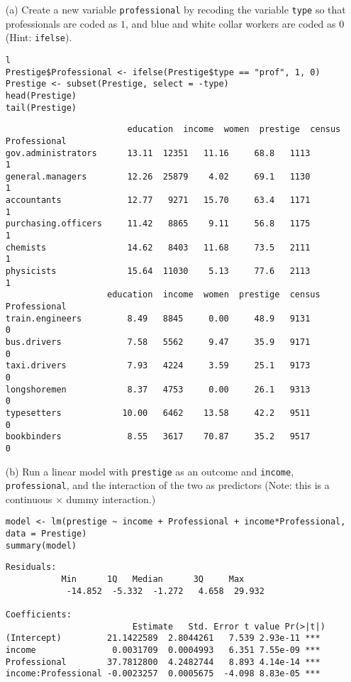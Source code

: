 \documentclass[12pt,letterpaper]{article}
\begin{document}
\newpage
\begin{enumerate}
	
	\item [(a)]
	Create a new variable \texttt{professional} by recoding the variable \texttt{type} so that professionals are coded as $1$, and blue and white collar workers are coded as $0$ (Hint: \texttt{ifelse}).
\begin{lstlisting}l
Prestige$Professional <- ifelse(Prestige$type == "prof", 1, 0)
Prestige <- subset(Prestige, select = -type)
head(Prestige)
tail(Prestige)	                                
\end{lstlisting}	                   
\begin{verbatim}
	                    education  income  women  prestige  census  Professional
gov.administrators      13.11  12351   11.16     68.8   1113            1
general.managers        12.26  25879    4.02     69.1   1130            1
accountants             12.77   9271   15.70     63.4   1171            1
purchasing.officers     11.42   8865    9.11     56.8   1175            1
chemists                14.62   8403   11.68     73.5   2111            1
physicists              15.64  11030    5.13     77.6   2113            1
                    education  income  women  prestige  census  Professional
train.engineers         8.49   8845     0.00     48.9   9131            0
bus.drivers             7.58   5562     9.47     35.9   9171            0
taxi.drivers            7.93   4224     3.59     25.1   9173            0
longshoremen            8.37   4753     0.00     26.1   9313            0
typesetters            10.00   6462    13.58     42.2   9511            0
bookbinders             8.55   3617    70.87     35.2   9517            0
\end{verbatim}
	
	
	\item [(b)]
	Run a linear model with \texttt{prestige} as an outcome and \texttt{income}, \texttt{professional}, and the interaction of the two as predictors (Note: this is a continuous $\times$ dummy interaction.)
\begin{lstlisting}
model <- lm(prestige ~ income + Professional + income*Professional, data = Prestige)
summary(model)
\end{lstlisting}
\begin{verbatim}
Residuals:   
           Min      1Q   Median      3Q     Max
	        -14.852  -5.332  -1.272   4.658  29.932 
   
Coefficients:                      
	                     Estimate   Std. Error t value Pr(>|t|)    
(Intercept)         21.1422589  2.8044261   7.539 2.93e-11 ***
income               0.0031709  0.0004993   6.351 7.55e-09 ***
Professional        37.7812800  4.2482744   8.893 4.14e-14 ***
income:Professional -0.0023257  0.0005675  -4.098 8.83e-05 ***


\end{verbatim}
\end{enumerate}
\end{document}
